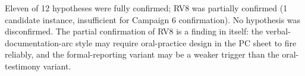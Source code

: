 Eleven of 12 hypotheses were fully confirmed; RV8 was partially confirmed (1 candidate
instance, insufficient for Campaign 6 confirmation). No hypothesis was disconfirmed.
The partial confirmation of RV8 is a finding in itself: the verbal-documentation-arc
style may require oral-practice design in the PC sheet to fire reliably, and the formal-reporting
variant may be a weaker trigger than the oral-testimony variant.
